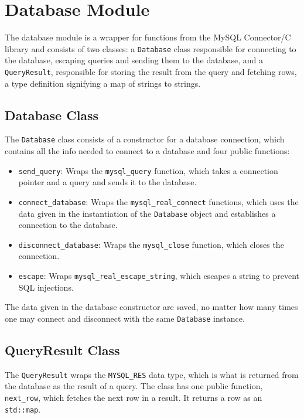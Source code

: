 \section{Database Module}
The database module is a wrapper for functions from the MySQL Connector/C library and consists of two classes: a \lstinline|Database| class responsible for connecting to the database, escaping queries and sending them to the database, and a \lstinline|QueryResult|, responsible for storing the result from the query and fetching rows, a type definition signifying a map of strings to strings.

\subsection{Database Class}
The \lstinline|Database| class consists of a constructor for a database connection, which contains all the info needed to connect to a database and four public functions:
\begin{itemize}
\item \lstinline|send_query|: Wraps the \lstinline|mysql_query| function, which takes a connection pointer and a query and sends it to the database.
\item \lstinline|connect_database|: Wraps the \lstinline|mysql_real_connect| functions, which uses the data given in the instantiation of the \lstinline|Database| object and establishes a connection to the database.
\item \lstinline|disconnect_database|: Wraps the \lstinline|mysql_close| function, which closes the connection.
\item \lstinline|escape|: Wraps \lstinline|mysql_real_escape_string|, which escapes a string to prevent SQL injections.
\end{itemize} 

The data given in the database constructor are saved, no matter how many times one may connect and disconnect with the same \lstinline|Database| instance.

\subsection{QueryResult Class}
The \lstinline|QueryResult| wraps the \lstinline|MYSQL_RES| data type, which is what is returned from the database as the result of a query. The class has one public function, \lstinline|next_row|, which fetches the next row in a result. It returns a row as an \lstinline|std::map|.